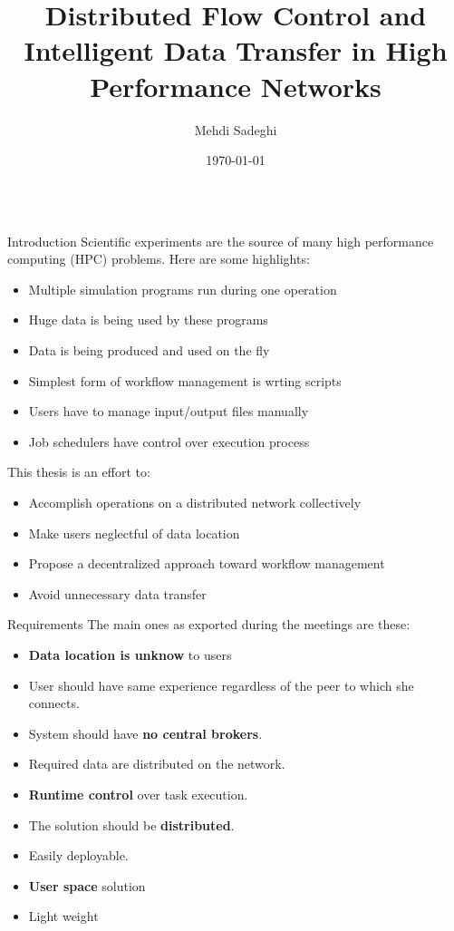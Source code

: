 \documentclass[final,hyperref={pdfpagelabels=true}]{beamer}
\title[Communication and Media Engineering]{Distributed Flow Control and Intelligent Data Transfer in High Performance Networks}
\author[msadeghi@stud.hs-offenburg.de]{Mehdi Sadeghi}
\institute[]{%
  Hochschule für Technik, Wirtschaft und Medien Offenburg\\[0.25\baselineskip]
  Fakultät Medien und Informationswesen\\[0.25\baselineskip]
  Professorin: Dr. Katharina Mehner-Heindl\\[0.25\baselineskip]
  Betreuer: Dr. Adham Hashibon
}
\date[\today]{\today}
\begin{document}
\begin{frame}
\fontsize{28pt}{29}\selectfont
  \begin{columns}[t]
    \begin{column}{.45\textwidth}
      \begin{block}{Introduction}
Scientific experiments are the source of many high performance computing (HPC) problems. Here are
some highlights:

\begin{itemize}
\item Multiple simulation programs run during one operation
\item Huge data is being used by these programs
\item Data is being produced and used on the fly
\item Simplest form of workflow management is wrting scripts
\item Users have to manage input/output files manually
\item Job schedulers have control over execution process
\end{itemize}

      This thesis is an effort to:%
      \begin{itemize}
      \item Accomplish operations on a distributed network collectively
      \item Make users neglectful of data location
      \item Propose a decentralized approach toward workflow management
      \item Avoid unnecessary data transfer
      \end{itemize}

      \end{block}
      
      \begin{block}{Requirements}
      The main ones as exported during the meetings are these:
        \begin{itemize}
        \item \textbf{Data location is unknow} to users
        \item User should have same experience regardless of the peer to which she connects.
        \item System should have \textbf{no central brokers}.
        \item Required data are distributed on the network.
        \item \textbf{Runtime control} over task execution.
        \item The solution should be \textbf{distributed}.
        \item Easily deployable.
        \item \textbf{User space} solution
        \item Light weight
        \end{itemize}
      \end{block}


\end{column}
\end{columns}
\end{frame}
\end{document}
